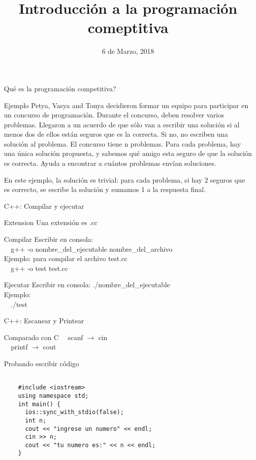 \documentclass{beamer}
\title[IPC]{Introducción a la programación comeptitiva}
\date{6 de Marzo, 2018}
\begin{document}
\begin{frame}{Qu\'e es la programación competitiva?}
\begin{block}{Ejemplo}
  Petya, Vasya and Tonya decidieron formar un equipo para participar en un concurso de programación. Durante el concurso, deben resolver varios problemas. Llegaron a un acuerdo de que sólo van a escribir una solución si al menos dos de ellos están seguros que es la correcta. Si no, no escriben una solución al problema.
  El concurso tiene n problemas. Para cada problema, hay una única solución propuesta, y sabemos qué amigo esta seguro de que la solución es correcta. Ayuda a encontrar a cuántos problemas envían soluciones.
\end{block}
\pause
\begin{block}{}
En este ejemplo, la solución es trivial: para cada problema, si hay 2 seguros que es correcto, se escribe la solución y sumamos 1 a la respuesta final.
\end{block}
\end{frame}
\begin{frame}{C++: Compilar y ejecutar}
\begin{block}{Extension}
Una extensión es .cc
\end{block}
\begin{block}{Compilar}
Escribir en consola:\\
\ \ g++ -o nombre\_del\_ejecutable nombre\_del\_archivo\\
Ejemplo: para compilar el archivo test.cc\\
\ \ g++ -o test test.cc
\end{block}
\begin{block}{Ejecutar}
Escribir en consola: ./nombre\_del\_ejecutable\\
Ejemplo:\\
\ \ ./test
\end{block}
\end{frame}

\begin{frame}{C++: Escanear y Printear}
  \begin{block}{Comparado con C}
    \ \ scanf $\rightarrow$ cin\\
    \ \ printf $\rightarrow$ cout
  \end{block}
\end{frame}

\begin{frame}[fragile]{Probando escribir código}
  \begin{lstlisting}

    #include <iostream>
    using namespace std;
    int main() {
      ios::sync_with_stdio(false);
      int n;
      cout << "ingrese un numero" << endl;
      cin >> n;
      cout << "tu numero es:" << n << endl;
    }
  \end{lstlisting}
\end{frame}
\end{document}
